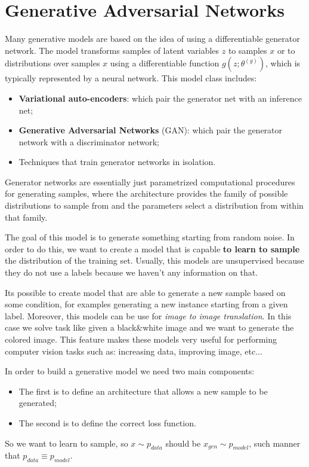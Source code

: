 \chapter{Generative Adversarial Networks}
Many generative models are based on the idea of using a differentiable generator
network. The model transforms samples of latent variables $z$ to samples $x$ or
to distributions over samples $x$ using a differentiable function $g(z; \theta^{(g)})$,
which is typically represented by a neural network. This model class includes:
\begin{itemize}
    \item \textbf{Variational auto-encoders}: which pair the generator net with
          an inference net;
    \item \textbf{Generative Adversarial Networks} (GAN): which pair the generator
          network with a discriminator network;
    \item Techniques that train generator networks in isolation.
\end{itemize}

Generator networks are essentially just parametrized computational procedures for
generating samples, where the architecture provides the family of possible
distributions to sample from and the parameters select a distribution from within
that family.

The goal of this model is to generate something starting from random noise. In
order to do this, we want to create a model that is capable \textbf{to learn to
    sample} the distribution of the training set. Usually, this models are
unsupervised because they do not use a labels because we haven't any information
on that.

Its possible to create model that are able to generate a new sample based on some
condition, for examples generating a new instance starting from a given label.
Moreover, this models can be use for \textit{image to image translation}. In this
case we solve task like given a black\&white image and we want to generate the
colored image. This feature makes these models very useful for performing computer
vision tasks such as: increasing data, improving image, etc$\dots$

In order to build a generative model we need two main components:
\begin{itemize}
    \item The first is to define an architecture that allows a new sample to be
          generated;
    \item The second is to define the correct loss function.
\end{itemize}
So we want to learn to sample, so $x \sim p_{data}$ should be $x_{gen}\sim p_{model}$,
such manner that $p_{data} \equiv p_{model}$.
